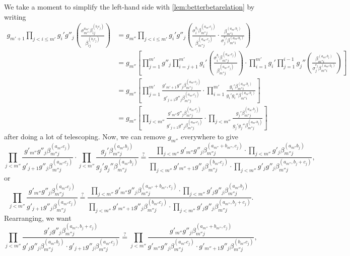 \documentclass{article}
\numberwithin{equation}{section}
\begin{document}
We take a moment to simplify the left-hand side with \autoref{lem:betterbetarelation} by writing
\begin{align*}
	g_{m'+1}\prod_{j<i\le m'}g_i'g''_j\left(\frac{\sigma_{m''}^{a_{m''}}\beta_{ij}^{(b_ic_j)}}{\beta_{ij}^{(b_ic_j)}}\right) &= g_{m''}\prod_{j<i\le m'}g_i'g''_j\left(\frac{\sigma_i^{b_i}\beta_{m''j}^{(a_{m''}c_j)}}{\beta_{m''j}^{(a_{m''}c_j)}}\cdot\frac{\beta_{m''i}^{(a_{m''}b_i)}}{\sigma_j^{c_j}\beta_{m''i}^{(a_{m''}b_i)}}\right) \\
	&= g_{m''}\left[\prod_{j=1}^{m'}g''_j\prod_{i=j+1}^{m'}g_i'\left(\frac{\sigma_i^{b_i}\beta_{m''j}^{(a_{m''}c_j)}}{\beta_{m''j}^{(a_{m''}c_j)}}\right)\cdot
	\prod_{i=1}^{m'}g_i'\prod_{j=1}^{i-1}g_j''\left(\frac{\beta_{m''i}^{(a_{m''}b_i)}}{\sigma_j^{c_j}\beta_{m''i}^{(a_{m''}b_i)}}\right)\right] \\
	&= g_{m''}\left[\prod_{j=1}^{m'}\frac{g'_{m'+1}g''_j\beta_{m''j}^{(a_{m''}c_j)}}{g'_{j+1}g''_j\beta_{m''j}^{(a_{m''}c_j)}}\cdot
	\prod_{i=1}^{m'}\frac{g_i'\beta_{m''i}^{(a_{m''}b_i)}}{g_i'g_i''\beta_{m''i}^{(a_{m''}b_i)}}\right] \\
	&= g_{m''}\left[\prod_{j<m''}\frac{g'_{m''}g''_j\beta_{m''j}^{(a_{m''}c_j)}}{g'_{j+1}g''_j\beta_{m''j}^{(a_{m''}c_j)}}\cdot
	\prod_{j<m''}\frac{g_j'\beta_{m''j}^{(a_{m''}b_j)}}{g_j'g_j''\beta_{m''j}^{(a_{m''}b_j)}}\right]
\end{align*}
after doing a lot of telescoping. Now, we can remove $g_{m''}$ everywhere to give
\[\prod_{j<m''}\frac{g'_{m''}g''_j\beta_{m''j}^{(a_{m''}c_j)}}{g'_{j+1}g''_j\beta_{m''j}^{(a_{m''}c_j)}}\cdot
\prod_{j<m''}\frac{g_j'\beta_{m''j}^{(a_{m''}b_j)}}{g_j'g_j''\beta_{m''j}^{(a_{m''}b_j)}}
\stackrel?=
\frac{\displaystyle\prod_{j<m''}g'_{m''}g''_j\beta_{m''j}^{(a_{m''}+b_{m''},c_j)}\cdot
\displaystyle\prod_{j<m''}g'_j\beta_{m''j}^{(a_{m''}b_j)}}
{\displaystyle\prod_{j<m''}g'_{m''+1}g''_j\beta_{m''j}^{(b_{m''}c_j)}\cdot
\prod_{j<m''}g'_jg''_j\beta_{m''j}^{(a_{m''},b_j+c_j)}},\]
or
\[\prod_{j<m''}\frac{g'_{m''}g''_j\beta_{m''j}^{(a_{m''}c_j)}}{g'_{j+1}g''_j\beta_{m''j}^{(a_{m''}c_j)}}
\stackrel?=
\frac{\displaystyle\prod_{j<m''}g'_{m''}g''_j\beta_{m''j}^{(a_{m''}+b_{m''},c_j)}\cdot
\displaystyle\prod_{j<m''}g'_jg''_j\beta_{m''j}^{(a_{m''}b_j)}}
{\displaystyle\prod_{j<m''}g'_{m''+1}g''_j\beta_{m''j}^{(b_{m''}c_j)}\cdot
\prod_{j<m''}g'_jg''_j\beta_{m''j}^{(a_{m''},b_j+c_j)}}.\]
Rearranging, we want
\[\prod_{j<m''}
\frac{g'_jg''_j\beta_{m''j}^{(a_{m''},b_j+c_j)}}
{g'_jg''_j\beta_{m''j}^{(a_{m''}b_j)}\cdot
g'_{j+1}g''_j\beta_{m''j}^{(a_{m''}c_j)}}
\stackrel?=\prod_{j<m''}
\frac{g'_{m''}g''_j\beta_{m''j}^{(a_{m''}+b_{m''},c_j)}}
{g'_{m''}g''_j\beta_{m''j}^{(a_{m''}c_j)}\cdot
g'_{m''+1}g''_j\beta_{m''j}^{(b_{m''}c_j)}},\]
\end{document}

